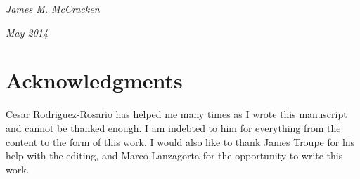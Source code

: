 \hfill{\em  James M. McCracken}

\hfill{\em May 2014}




\newpage
\chapter*{Acknowledgments}
Cesar Rodriguez-Rosario has helped me many times as I wrote this manuscript and cannot be thanked enough.  I am indebted to him for everything from the content to the form of this work.  I would also like to thank James Troupe for his help with the editing, and Marco Lanzagorta for the opportunity to write this work.

\newpage

